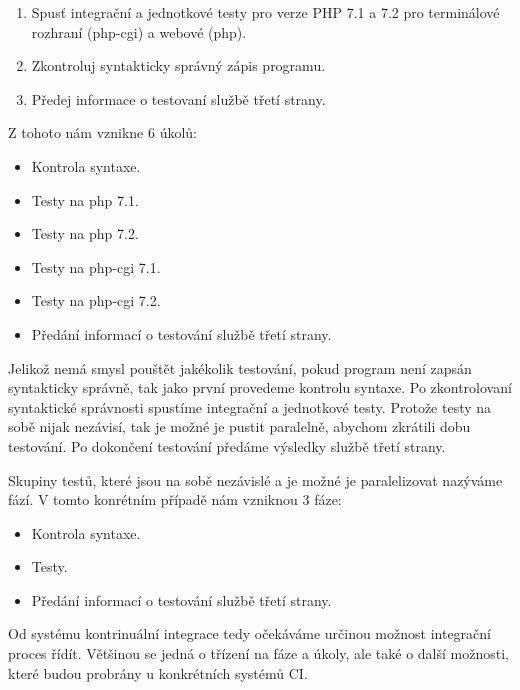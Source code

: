 \begin{enumerate}
	\item Spusť integrační a jednotkové testy pro verze PHP 7.1 a 7.2 pro terminálové rozhraní (php-cgi) a webové (php).
	\item Zkontroluj syntakticky správný zápis programu.
	\item Předej informace o testovaní službě třetí strany.
\end{enumerate}

Z tohoto nám vznikne 6 úkolů:

\begin{itemize}
	\item Kontrola syntaxe.
	\item Testy na php 7.1.
	\item Testy na php 7.2.
	\item Testy na php-cgi 7.1.
	\item Testy na php-cgi 7.2.
	\item Předání informací o testování službě třetí strany.
\end{itemize}

Jelikož nemá smysl pouštět jakékolik testování, pokud program není zapsán syntakticky správně, tak jako první provedeme kontrolu syntaxe.
Po zkontrolovaní syntaktické správnosti spustíme integrační a jednotkové testy.
Protože testy na sobě nijak nezávisí, tak je možné je pustit paralelně, abychom zkrátili dobu testování.
Po dokončení testování předáme výsledky službě třetí strany.

Skupiny testů, které jsou na sobě nezávislé a je možné je paralelizovat nazýváme fází.
V tomto konrétním případě nám vzniknou 3 fáze:

\begin{itemize}
	\item Kontrola syntaxe.
	\item Testy.
	\item Předání informací o testování službě třetí strany.
\end{itemize}

Od systému kontrinuální integrace tedy očekáváme určinou možnost integrační proces řídít.
Většinou se jedná o třízení na fáze a úkoly, ale také o další možnosti, které budou probrány u konkrétních systémů CI.
